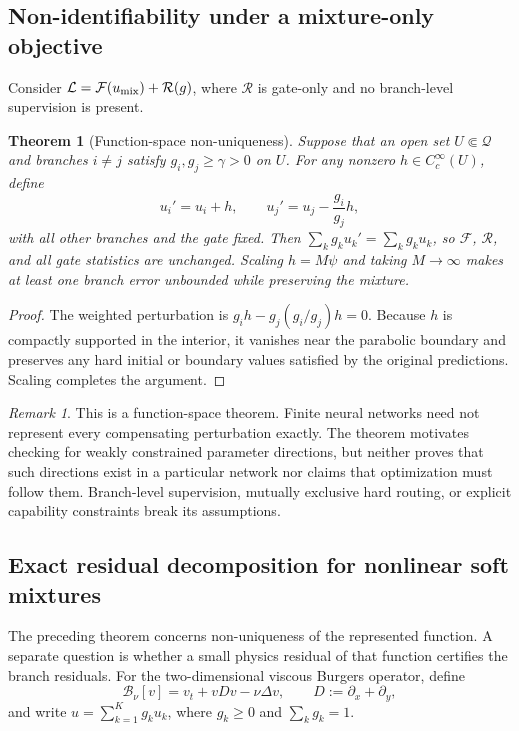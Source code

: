 \documentclass[preprint,12pt]{elsarticle}
\newtheorem{theorem}{Theorem}
\theoremstyle{remark}
\newtheorem{remark}{Remark}
\begin{document}
\subsection{Non-identifiability under a mixture-only objective}
Consider $\mathcal L=\mathcal F(u_{\rm mix})+\mathcal R(g)$, where $\mathcal R$ is gate-only and no branch-level supervision is present.
\begin{theorem}[Function-space non-uniqueness]\label{thm:nonident}
Suppose that an open set $U\Subset\mathcal Q$ and branches $i\ne j$ satisfy $g_i,g_j\ge\gamma>0$ on $U$. For any nonzero $h\in C_c^\infty(U)$, define
\begin{equation}
u_i'=u_i+h,\qquad u_j'=u_j-\frac{g_i}{g_j}h,
\end{equation}
with all other branches and the gate fixed. Then $\sum_k g_ku_k'=\sum_k g_ku_k$, so $\mathcal F$, $\mathcal R$, and all gate statistics are unchanged. Scaling $h=M\psi$ and taking $M\to\infty$ makes at least one branch error unbounded while preserving the mixture.
\end{theorem}
\begin{proof}
The weighted perturbation is $g_ih-g_j(g_i/g_j)h=0$. Because $h$ is compactly supported in the interior, it vanishes near the parabolic boundary and preserves any hard initial or boundary values satisfied by the original predictions. Scaling completes the argument.
\end{proof}
\begin{remark}
This is a function-space theorem. Finite neural networks need not represent every compensating perturbation exactly. The theorem motivates checking for weakly constrained parameter directions, but neither proves that such directions exist in a particular network nor claims that optimization must follow them. Branch-level supervision, mutually exclusive hard routing, or explicit capability constraints break its assumptions.
\end{remark}

\subsection{Exact residual decomposition for nonlinear soft mixtures}
The preceding theorem concerns non-uniqueness of the represented function. A
separate question is whether a small physics residual of that function certifies
the branch residuals. For the two-dimensional viscous Burgers operator, define
\begin{equation}
\mathcal B_\nu[v]
=v_t+vD v-\nu\Delta v,
\qquad D:=\partial_x+\partial_y,
\label{eq:burgers_operator}
\end{equation}
and write $u=\sum_{k=1}^K g_k u_k$, where $g_k\ge0$ and
$\sum_k g_k=1$.
\end{document}
